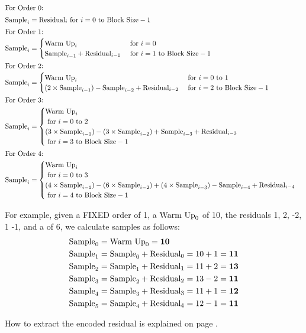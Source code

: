 \begin{align*}
\intertext{For Order 0:}
\text{Sample}_i &= \text{Residual}_i \text{ for } i = 0 \text{ to Block Size} - 1 \\
\intertext{For Order 1:}
\text{Sample}_i &=
\begin{cases}
\text{Warm Up}_i & \text{ for } i = 0 \\
\text{Sample}_{i - 1} + \text{Residual}_{i - 1} & \text{ for } i = 1 \text{ to Block Size} - 1
\end{cases} \\
\intertext{For Order 2:}
\text{Sample}_i &=
\begin{cases}
\text{Warm Up}_i & \text{ for } i = 0 \text{ to } 1 \\
( 2 \times \text{Sample}_{i - 1} ) - \text{Sample}_{i - 2} + \text{Residual}_{i - 2} & \text{ for } i = 2 \text{ to Block Size} - 1
\end{cases} \\
\intertext{For Order 3:}
\text{Sample}_i &=
\begin{cases}
\text{Warm Up}_i \\
\text{ for } i = 0 \text{ to } 2 \\
( 3 \times \text{Sample}_{i - 1} ) - ( 3 \times \text{Sample}_{i - 2} ) + \text{Sample}_{i - 3} + \text{Residual}_{i - 3} \\
\text{ for } i = 3 \text{ to Block Size} - 1
\end{cases} \\
\intertext{For Order 4:}
\text{Sample}_i &=
\begin{cases}
\text{Warm Up}_i \\
\text{ for } i = 0 \text{ to } 3 \\
( 4 \times \text{Sample}_{i - 1} ) - ( 6 \times \text{Sample}_{i - 2} ) + (4 \times \text{Sample}_{i - 3} ) - \text{Sample}_{i - 4} + \text{Residual}_{i - 4} \\
\text{ for } i = 4 \text{ to Block Size} - 1
\end{cases}
\end{align*}

For example, given a FIXED order of 1, a $\text{Warm Up}_0$ of 10,
the residuals 1, 2, -2, 1 -1, and a  of 6, we calculate
samples as follows:
\begin{align*}
\text{Sample}_0 &= \text{Warm Up}_0 = \textbf{10} \\
\text{Sample}_1 &= \text{Sample}_0 + \text{Residual}_0 = 10 + 1 = \textbf{11} \\
\text{Sample}_2 &= \text{Sample}_1 + \text{Residual}_1 = 11 + 2 = \textbf{13} \\
\text{Sample}_3 &= \text{Sample}_2 + \text{Residual}_2 = 13 - 2 = \textbf{11} \\
\text{Sample}_4 &= \text{Sample}_3 + \text{Residual}_3 = 11 + 1 = \textbf{12} \\
\text{Sample}_5 &= \text{Sample}_4 + \text{Residual}_4 = 12 - 1 = \textbf{11}
\end{align*}
\par
\noindent
How to extract the encoded residual is explained on page
\pageref{flac_residual}.

